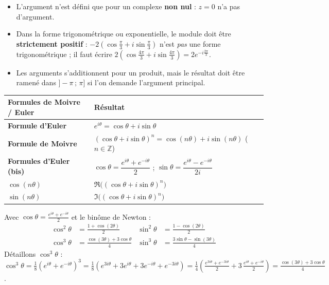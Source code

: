 \documentclass[11pt]{article}
\renewcommand{\arraystretch}{1.25}
\begin{document}
\begin{attention}
\begin{itemize}
    \item L'argument n'est défini que pour un complexe \textbf{non nul} : $z = 0$ n'a pas d'argument.
    \item Dans la forme trigonométrique ou exponentielle, le module doit être \textbf{strictement positif} : $-2\left(\cos\frac{\pi}{3}+i\sin\frac{\pi}{3}\right)$ n'est \emph{pas} une forme trigonométrique ; il faut écrire $2\left(\cos\frac{4\pi}{3}+i\sin\frac{4\pi}{3}\right) = 2e^{-i\frac{2\pi}{3}}$.
    \item Les arguments s'additionnent pour un produit, mais le résultat doit être ramené dans $]-\pi\,;\,\pi]$ si l'on demande l'argument principal.
\end{itemize}
\end{attention}

\vspace{0.3cm}
\begin{center}
\renewcommand{\arraystretch}{1.6}
\begin{tabularx}{\linewidth}{|>{\bfseries}l|X|}\hline
\rowcolor{popgreenL}
\textbf{Formules de Moivre / Euler} & \textbf{Résultat} \\ \hline
Formule d'Euler & $e^{i\theta} = \cos\theta + i\sin\theta$ \\ \hline
Formule de Moivre & $(\cos\theta + i\sin\theta)^n = \cos(n\theta) + i\sin(n\theta)$ \quad ($n\in\mathbb{Z}$) \\ \hline
Formules d'Euler (bis) & $\cos\theta = \dfrac{e^{i\theta}+e^{-i\theta}}{2}$ \quad ; \quad $\sin\theta = \dfrac{e^{i\theta}-e^{-i\theta}}{2i}$ \\ \hline
$\cos(n\theta)$ & $\Re\big((\cos\theta + i\sin\theta)^n\big)$ \\ \hline
$\sin(n\theta)$ & $\Im\big((\cos\theta + i\sin\theta)^n\big)$ \\ \hline
\end{tabularx}
\end{center}

\begin{exemplebox}
Avec $\cos\theta = \frac{e^{i\theta}+e^{-i\theta}}{2}$ et le binôme de Newton :
\begin{align*}
\cos^2\theta &= \frac{1+\cos(2\theta)}{2} &
\sin^2\theta &= \frac{1-\cos(2\theta)}{2} \\
\cos^3\theta &= \frac{\cos(3\theta)+3\cos\theta}{4} &
\sin^3\theta &= \frac{3\sin\theta-\sin(3\theta)}{4}
\end{align*}
Détaillons $\cos^3\theta$ : $\cos^3\theta = \frac{1}{8}\left(e^{i\theta}+e^{-i\theta}\right)^3 = \frac{1}{8}\left(e^{3i\theta}+3e^{i\theta}+3e^{-i\theta}+e^{-3i\theta}\right) = \frac{1}{4}\left(\frac{e^{3i\theta}+e^{-3i\theta}}{2}+3\,\frac{e^{i\theta}+e^{-i\theta}}{2}\right) = \frac{\cos(3\theta)+3\cos\theta}{4}$.
\end{exemplebox}
\end{document}
